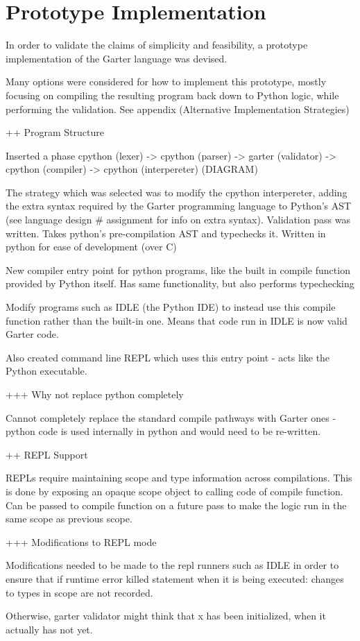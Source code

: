 \glsresetall %
\chapter{Prototype Implementation}\label{ch:Prototype}

In order to validate the claims of simplicity and feasibility, a prototype implementation of the Garter language was devised.

Many options were considered for how to implement this prototype, mostly focusing on compiling the resulting program back down to Python logic, while performing the validation.
See appendix (Alternative Implementation Strategies)

++ Program Structure

Inserted a phase
cpython (lexer) -> cpython (parser) -> garter (validator) -> cpython (compiler) -> cpython (interpereter) (DIAGRAM)

The strategy which was selected was to modify the cpython interpereter, adding the extra syntax required by the Garter programming language to Python's AST (see language design # assignment for info on extra syntax).
Validation pass was written. Takes python's pre-compilation AST and typechecks it. Written in python for ease of development (over C)

New compiler entry point for python programs, like the built in compile function provided by Python itself. Has same functionality, but also performs typechecking

Modify programs such as IDLE (the Python IDE) to instead use this compile function rather than the built-in one. Means that code run in IDLE is now valid Garter code.

Also created command line REPL which uses this entry point - acts like the Python executable.

+++ Why not replace python completely

Cannot completely replace the standard compile pathways with Garter ones - python code is used internally in python and would need to be re-written.

++ REPL Support

REPLs require maintaining scope and type information across compilations. This is done by exposing
an opaque scope object to calling code of compile function. Can be passed to compile function on
a future pass to make the logic run in the same scope as previous scope.

+++ Modifications to REPL mode

Modifications needed to be made to the repl runners such as IDLE in order to ensure that if runtime error killed statement when it is being executed: changes to types in scope are not recorded.

Otherwise, garter validator might think that x has been initialized, when it actually has not yet.


